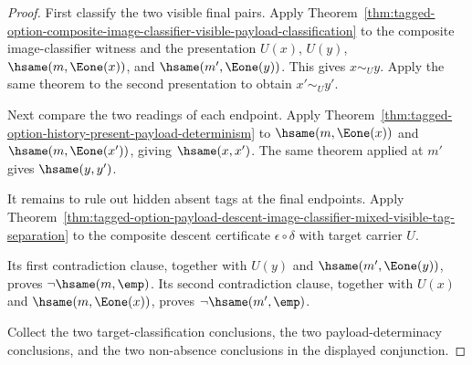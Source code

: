 \begin{proof}
First classify the two visible final pairs. Apply
Theorem~\ref{thm:tagged-option-composite-image-classifier-visible-payload-classification}
to the composite image-classifier witness and the presentation
$U(x)$, $U(y)$, $\hsame(m,\Eone(x))$, and $\hsame(m',\Eone(y))$. This gives
$x\sim_U y$. Apply the same theorem to the second presentation to obtain
$x'\sim_U y'$.

Next compare the two readings of each endpoint. Apply
Theorem~\ref{thm:tagged-option-history-present-payload-determinism} to
$\hsame(m,\Eone(x))$ and $\hsame(m,\Eone(x'))$, giving $\hsame(x,x')$.
The same theorem applied at $m'$ gives $\hsame(y,y')$.

It remains to rule out hidden absent tags at the final endpoints. Apply
Theorem~\ref{thm:tagged-option-payload-descent-image-classifier-mixed-visible-tag-separation}
to the composite descent certificate $\epsilon\circ\delta$ with target carrier
$U$.

Its first contradiction clause, together with $U(y)$ and
$\hsame(m',\Eone(y))$, proves $\neg\hsame(m,\emp)$. Its second contradiction
clause, together with $U(x)$ and $\hsame(m,\Eone(x))$, proves
$\neg\hsame(m',\emp)$.

Collect the two target-classification conclusions, the two payload-determinacy
conclusions, and the two non-absence conclusions in the displayed conjunction.
\end{proof}
